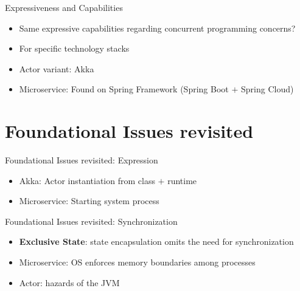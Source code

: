 \documentclass{beamer}
\begin{document}
\begin{frame}{Expressiveness and Capabilities}

\begin{itemize}
  \item Same expressive capabilities regarding concurrent programming concerns?
  \item For specific technology stacks
  \item Actor variant: Akka
  \item Microservice: Found on Spring Framework (Spring Boot $+$ Spring Cloud)
\end{itemize}

\end{frame}


\section{Foundational Issues revisited}


\begin{frame}{Foundational Issues revisited: Expression}

\begin{itemize}
  \item Akka: Actor instantiation from class $+$ runtime
  \item Microservice: Starting system process
\end{itemize}

\end{frame}


\begin{frame}{Foundational Issues revisited: Synchronization}

\begin{itemize}
  \item \textbf{Exclusive State}: state encapsulation omits the need for synchronization
  \item Microservice: OS enforces memory boundaries among processes
  \item Actor: hazards of the JVM
\end{itemize}

\end{frame}

\end{document}
